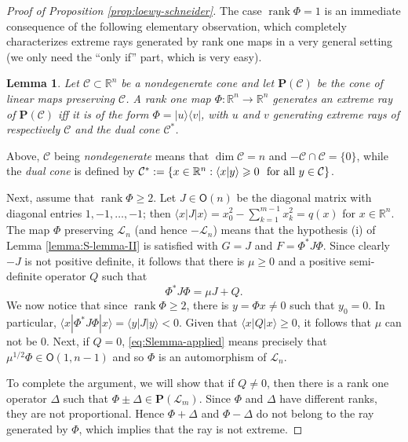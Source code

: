 \documentclass[10pt]{article}
\DeclareMathOperator{\rank}{rank}
\renewcommand{\geq}{\geqslant}
\newcommand{\LP}{\cP(\mathcal{L}_m)}
\newcommand{\cP}{\bm{P}}
\newcommand{\R}{\mathbb{R}}
\newcommand{\gO}{\mathsf{O}}
\newcommand{\mC}{\mathcal{C}}
\newcommand{\braket}[2]{\langle #1 | #2\rangle}
\newcommand{\ketbra}[2]{| #1 \rangle \langle #2 |}
\newcommand{\bra}[1]{\langle #1 |}
\newcommand{\ket}[1]{| #1 \rangle}
\theoremstyle{plain}
\newtheorem{lemma}[theorem]{Lemma}
\theoremstyle{definition}
\theoremstyle{remark}
\begin{document}
\begin{proof} [Proof of Proposition \ref{prop:loewy-schneider}]  
The  case $\rank \Phi = 1$ is an immediate consequence of the following elementary observation, 
which completely characterizes extreme rays generated by rank one maps 
in a very general setting (we only need the ``only if'' part, which is very easy).  

\begin{lemma} \label{lemma:extreme-rank-one}
Let $\mC \subset \R^n$ be a nondegenerate cone and let $\cP(\mC)$ be the cone of 
linear maps preserving $\mC$.   
A rank one map $\Phi : \R^n \to \R^n$ generates an extreme ray of $\cP(\mC)$ iff 
it is of the form $\Phi = \ketbra{u}{v}$, with $u$ and $v$ generating extreme rays of 
respectively $\mC$ and the dual cone $\mC^*$.
\end{lemma}
Above, $\mC$ being {\em nondegenerate} means that $\dim \mC = n$ and $-\mC \cap \mC = \{0\}$, 
while the {\em dual cone} is defined by $\mC^* := \{x \in \R^n :  \braket{x}{y} \geq 0 \ \hbox{ for all } y \in \mC\}$. 

Next, assume that $\rank \Phi \geq 2$. Let $J \in \gO(n)$ be the diagonal matrix with 
diagonal entries $1,-1,\ldots,-1$; then $\bra{x} J \ket{x}  = x_0^2-\sum_{k=1}^{m-1} x_k^2 = q(x) $ for $x\in \R^n$.  
The map $\Phi$ preserving $\mathcal{L}_n$ (and hence $-\mathcal{L}_n$) means that 
the hypothesis (i) of Lemma \ref{lemma:S-lemma-II} is satisfied with $G=J$ 
and $F=\Phi^* J \Phi$. Since clearly $-J$ is not positive definite, it follows that 
there is $\mu\geq 0$ and a positive semi-definite operator $Q$ such that 
\begin{equation} \label{eq:Slemma-applied}
\Phi^* J \Phi = \mu J +Q .
\end{equation} 
We now notice that  since $\rank \Phi \geq 2$, 
there is $y = \Phi x \neq 0$ such that $y_0=0$. In particular,  
$\bra{x}\Phi^* J \Phi\ket{x} = \bra{y} J \ket{y} < 0$. Given that  $\bra{x} Q \ket{x} \geq 0$, 
it follows that $\mu$ can not be $0$.  
Next, if $Q=0$, \eqref{eq:Slemma-applied} means precisely that $\mu^{1/2}\Phi \in 
\gO(1,n-1)$ and so $\Phi$ is an automorphism of $\mathcal{L}_n$. 

To complete the argument, we will show that if $Q\neq 0$, then there is a rank one operator 
$\Delta$ such that $\Phi \pm \Delta \in \LP$. 
Since $\Phi$ and $\Delta$ have different ranks, 
they are not proportional. Hence $\Phi + \Delta$ and $\Phi -\Delta$ do not belong 
to the ray generated by $\Phi$, which implies that the ray is not extreme. 


\end{proof}
\end{document}

